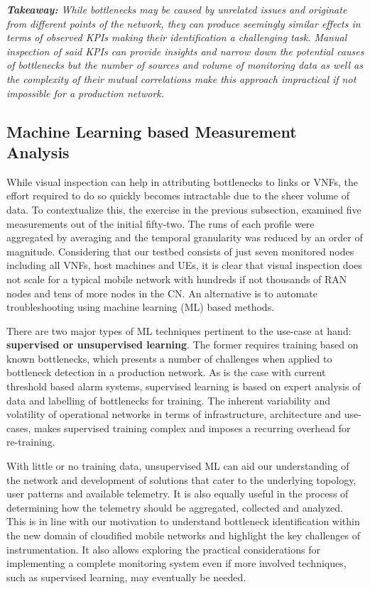 \documentclass[journal,comsoc]{IEEEtran}
\begin{document}
% 
{\em \textbf{Takeaway:} While bottlenecks may be caused by unrelated issues and originate from different points of the network, they can produce seemingly similar effects in terms of observed KPIs making their identification a challenging task.
Manual inspection of said KPIs can provide insights and narrow down the potential causes of bottlenecks but the number of sources and volume of monitoring data as well as the complexity of their mutual correlations make this approach impractical if not impossible for a production network.}

%
\subsection{Machine Learning based Measurement Analysis}

% 
While visual inspection can help in attributing bottlenecks to links or VNFs, the effort required to do so quickly becomes intractable due to the sheer volume of data.
To contextualize this, the exercise in the previous subsection, examined five measurements out of the initial fifty-two.
The runs of each profile were aggregated by averaging and the temporal granularity was reduced by an order of magnitude.
Considering that our testbed consists of just seven monitored nodes including all VNFs, host machines and UEs, it is clear that visual inspection does not scale for a typical mobile network with hundreds if not thousands of RAN nodes and tens of more nodes in the CN.  
An alternative is to automate troubleshooting using machine learning (ML) based methods. 

There are two major types of ML techniques pertinent to the use-case at hand: \textbf{supervised or unsupervised learning}.
The former requires training based on known bottlenecks, which presents a number of challenges when applied to bottleneck detection in a production network.
As is the case with current threshold based alarm systems, supervised learning is based on expert analysis of data and labelling of bottlenecks for training.
The inherent variability and volatility of operational networks in terms of infrastructure, architecture and use-cases, makes supervised training complex and imposes a recurring overhead for re-training.


With little or no training data, unsupervised ML can aid our understanding of the network and development of solutions that cater to the underlying topology, user patterns and available telemetry.
It is also equally useful in the process of determining how the telemetry should be aggregated, collected and analyzed.
This is in line with our motivation to understand bottleneck identification within the new domain of cloudified mobile networks and highlight the key challenges of instrumentation.
It also allows exploring the practical considerations for implementing a complete monitoring system even if more involved techniques, such as supervised learning, may eventually be needed.
\end{document}
